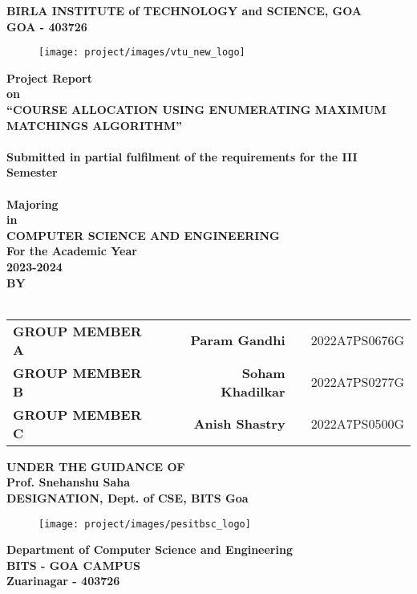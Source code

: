\newpage
\begin{center}
	\thispagestyle{empty}
	\Large{\textbf{\color{myred}BIRLA INSTITUTE of TECHNOLOGY and SCIENCE, GOA\\ \large{GOA - 403726}}}\\
	\begin{figure}[h]
		\centering
		\texttt{[image: project/images/vtu\_new\_logo]}
		\label{fig:vtulogo}
	\end{figure}
	\large{\textbf{Project Report\\ on \\}}
	\LARGE{\textsc {\textbf{\color{blue}``COURSE ALLOCATION USING ENUMERATING MAXIMUM MATCHINGS ALGORITHM''}}}\\
	\large{\textbf{\\Submitted in partial fulfilment of the requirements for the III Semester\\}}
	\Large{\textbf{\\ \color{mygreen}Majoring \\ in \\ COMPUTER SCIENCE AND ENGINEERING\\ For the Academic Year \\ 2023-2024}}
	\Large{\textbf{\\BY}}\\ \\ 
	\begin{table}[h]
\centering
\Large{
\begin{tabular}{>{\bfseries}lc>{\bfseries}r}
GROUP MEMBER A & & Param Gandhi & & 2022A7PS0676G \\GROUP MEMBER B & & Soham Khadilkar & & 2022A7PS0277G\\GROUP MEMBER C & & Anish Shastry & & 2022A7PS0500G \\
\end{tabular}}
\end{table}
	\vspace{0.5cm}
	\large{\textbf{UNDER THE GUIDANCE OF}}\\ 
	\large{\textbf{\color{mygreen}Prof. Snehanshu Saha}}\\
	\large{\textbf{\color{mygreen}DESIGNATION, Dept. of CSE, BITS Goa}}\\
	\begin{figure}[h]
		\centering
		\texttt{[image: project/images/pesitbsc\_logo]}
		\label{fig:pesitbsclogo}
	\end{figure}
	\Large{\textbf{Department of Computer Science and Engineering}}\\
	\Large{\textbf{BITS - GOA CAMPUS}}
	\large{\textbf{\\Zuarinagar - 403726}}\\
	\newpage
\end{center}

